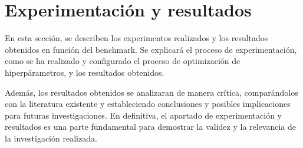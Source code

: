 \section{Experimentación y resultados}
En esta sección, se describen los experimentos realizados y los resultados
obtenidos en función del benchmark. Se explicará el proceso de experimentación,
como se ha realizado y configurado el proceso de optimización de hiperpárametros, y 
los resultados obtenidos.\medskip

Además, los resultados obtenidos se analizaran de manera crítica, 
comparándolos con la literatura existente y estableciendo conclusiones y 
posibles implicaciones para futuras investigaciones. En definitiva, el 
apartado de experimentación y resultados es una parte fundamental para 
demostrar la validez y la relevancia de la investigación realizada.





\pagebreak
